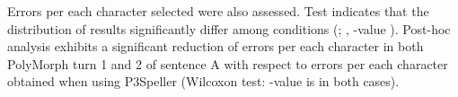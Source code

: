 Errors per each character selected were also assessed. Test indicates that the distribution of results significantly differ 
among conditions (;  , -value ). Post-hoc analysis 
exhibits a significant reduction of errors per each character in both PolyMorph turn 1 and 2 of sentence A 
with respect to errors per each character 
obtained when using P3Speller (Wilcoxon test: -value is   in both cases). 


